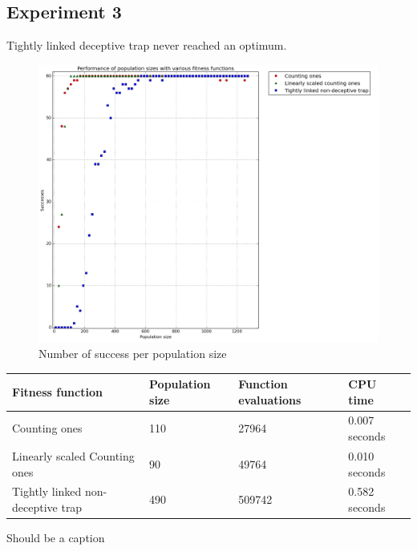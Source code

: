 \documentclass[12pt]{article}
\theoremstyle{definition}
\begin{document}
\subsection*{Experiment 3}
\label{exp3}
Tightly linked deceptive trap never reached an optimum.

\begin{figure}[H]
    \centering
    \includegraphics[totalheight=0.7\textheight]{images/exp3.png}
    \caption{Number of success per population size}
\label{fig:exp3}
\end{figure}

\begin{adjustwidth}{0cm}{}
\begin{minipage}{\linewidth}
\centering
{}
\label{tab:title}
\begin{tabular}{lp{2.5cm}p{2.5cm}l}
\toprule[1.5pt]
\bf Fitness function & \bf Population size & \bf Function evaluations & \bf CPU time\\\midrule
Counting ones & 110 & 27964 & 0.007 seconds \\
Linearly scaled Counting ones & 90 & 49764 & 0.010 seconds \\
Tightly linked non-deceptive trap & 490 & 509742 & 0.582 seconds \\
\bottomrule[1.25pt]
\end{tabular}\par
\bigskip
Should be a caption
\end{minipage}
\end{adjustwidth}
\end{document}
